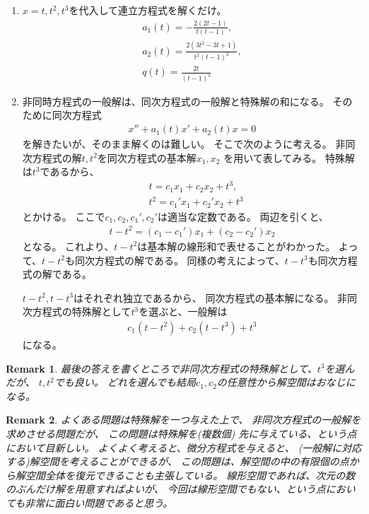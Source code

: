 \documentclass[fleqn]{jsarticle}
\newtheorem{remark}{Remark}
\begin{document}
\begin{enumerate}
\item $x=t,t^{2},t^{3}$を代入して連立方程式を解くだけ。
\begin{eqnarray}
a_{1}(t)=-\frac{2(2t-1)}{t(t-1)},\\
a_{2}(t)=\frac{2(3t^{2}-3t+1)}{t^{2}(t-1)^{2}},\\
q(t)=\frac{2t}{(t-1)^{2}}
\end{eqnarray}
\item 非同時方程式の一般解は、同次方程式の一般解と特殊解の和になる。
そのために同次方程式
\begin{eqnarray}
x''+a_{1}(t)x'+a_{2}(t)x=0
\end{eqnarray}
を解きたいが、そのまま解くのは難しい。
そこで次のように考える。
非同次方程式の解$t,t^{2}$を同次方程式の基本解$x_{1},x_{2}$
を用いて表してみる。
特殊解は$t^{3}$であるから、
\begin{eqnarray}
&t=c_{1}x_{1}+c_{2}x_{2}+t^{3},\\
&t^{2}=c_{1}'x_{1}+c_{2}'x_{2}+t^{3}
\end{eqnarray}
とかける。
ここで$c_{1},c_{2},c_{1}',c_{2}'$は適当な定数である。
両辺を引くと、
\begin{eqnarray}
t-t^{2}=(c_{1}-c_{1}')x_{1}+(c_{2}-c_{2}')x_{2}
\end{eqnarray}
となる。
これより、$t-t^{2}$は基本解の線形和で表せることがわかった。
よって、$t-t^{2}$も同次方程式の解である。
同様の考えによって、$t-t^{3}$も同次方程式の解である。

$t-t^{2},t-t^{3}$はそれぞれ独立であるから、
同次方程式の基本解になる。
非同次方程式の特殊解として$t^{3}$を選ぶと、一般解は
\begin{eqnarray}
c_{1}(t-t^{2})+c_{2}(t-t^{3})+t^{3}
\end{eqnarray}
になる。
\end{enumerate}
\begin{remark}
最後の答えを書くところで非同次方程式の特殊解として、$t^{3}$を選んだが、
$t,t^{2}$でも良い。
どれを選んでも結局$c_{1},c_{2}$の任意性から解空間はおなじになる。
\end{remark}

\begin{remark}
よくある問題は特殊解を一つ与えた上で、
非同次方程式の一般解を求めさせる問題だが、
この問題は特殊解を(複数個)
先に与えている、という点において目新しい。
よくよく考えると、微分方程式を与えると、
(一般解に対応する)解空間を考えることができるが、
この問題は、解空間の中の有限個の点から解空間全体を復元できることも主張している。
線形空間であれば、次元の数のぶんだけ解を用意すればよいが、
今回は線形空間でもない、という点においても非常に面白い問題であると思う。
\end{remark}
\end{document}
